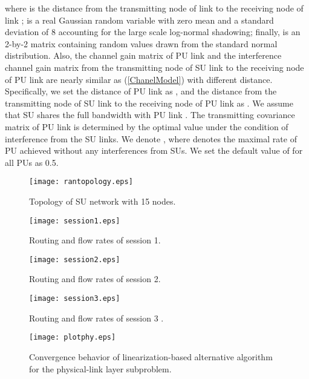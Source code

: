 \documentclass[12pt,onecolumn,tworows]{IEEEtran}
\begin{document}
where  is the distance from the transmitting node of link  to the receiving node of link ;  is
a real Gaussian random variable with zero mean and a standard deviation of 8 accounting for
the large scale
log-normal shadowing; finally,  is an 2-by-2 matrix containing random values drawn from the standard normal distribution.
Also, the channel gain matrix of PU link and the interference channel gain matrix from the transmitting node of SU link  to the receiving node of PU link  are
nearly similar as (\ref{ChanelModel}) with different distance. Specifically, we set the distance of PU link  as , and the distance from the transmitting node of SU link  to the receiving node of PU link  as . We assume that SU  shares the full bandwidth with PU link . The transmitting covariance matrix  of PU link  is determined by the optimal value under the condition of interference from the SU links.
We denote ,
where  denotes the maximal rate of PU  achieved without any interferences from SUs.
We set the default value of  for all PUs as 0.5.


\begin{figure}
\centering
\texttt{[image: rantopology.eps]}
\centering
\caption{Topology of SU network with 15 nodes.}
\centering
\label{fig:fig1}
\centering
\end{figure}

\begin{figure}
\centering
\texttt{[image: session1.eps]}
\centering
\caption{Routing and flow rates of session 1.}
\centering
\label{fig:fig2}
\centering
\end{figure}

\begin{figure}
\centering
\texttt{[image: session2.eps]}
\centering
\caption{Routing and flow rates of session 2.}
\centering
\label{fig:fig3}
\centering
\end{figure}

\begin{figure}
\centering
\texttt{[image: session3.eps]}
\centering
\caption{Routing and flow rates of session 3 .}
\centering
\label{fig:fig4}
\centering
\end{figure}

\begin{figure}
\centering
\texttt{[image: plotphy.eps]}
\centering
\caption{Convergence behavior of linearization-based alternative algorithm for the physical-link layer subproblem.}
\centering
\label{fig:fig5}
\centering
\end{figure}
\end{document}
